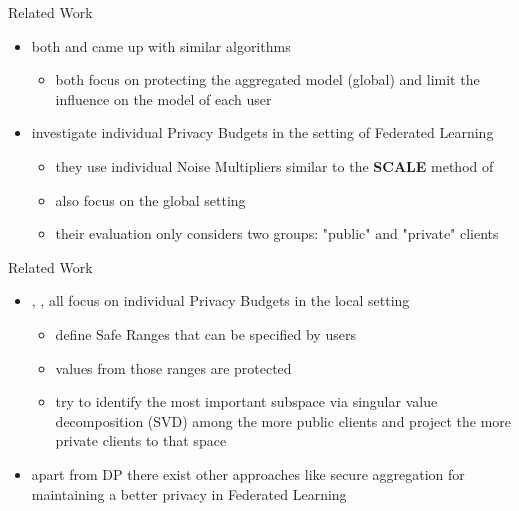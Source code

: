 \documentclass[aspectratio=169]{beamer}
\begin{document}
\begin{frame}{Related Work}
    \begin{itemize}
        \item both \textcite{geyer:2017} and \textcite{mcmahan:2018} came up with similar algorithms
        \begin{itemize}
            \item both focus on protecting the aggregated model (global) and limit the influence on the model of each user
        \end{itemize}
        \item<2-> \textcite{aldaghri:2023} investigate individual Privacy Budgets in the setting of Federated Learning
        \begin{itemize}
            \item they use individual Noise Multipliers similar to the \textbf{SCALE} method of \textcite{boenisch:2023}
            \item also focus on the global setting
            \item their evaluation only considers two groups: "public" and "private" clients
        \end{itemize}
    \end{itemize}
\end{frame}

\begin{frame}{Related Work}
    \begin{itemize}
        \item \textcite{shen:2023}, \textcite{liu:2021}, \textcite{yang:2021} all focus on individual Privacy Budgets in the local setting
        \begin{itemize}
            \item \textcite{shen:2023} define Safe Ranges that can be specified by users
            \item values from those ranges are protected
            \item \textcite{liu:2021} try to identify the most important subspace via singular value decomposition (SVD) among the more public clients and project the more private clients to that space
        \end{itemize}
        \item apart from DP there exist other approaches like secure aggregation for maintaining a better privacy in Federated Learning
    \end{itemize}
\end{frame}
\end{document}
